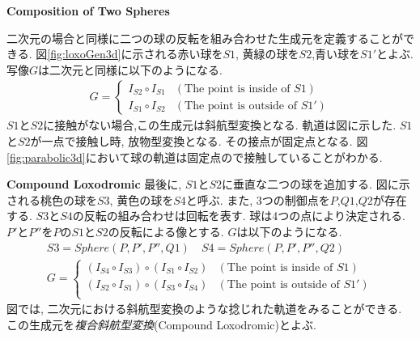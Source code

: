 \noindent\textbf{Composition of Two Spheres}

二次元の場合と同様に二つの球の反転を組み合わせた生成元を定義することができる.
図\ref{fig:loxoGen3d}に示される赤い球を$S1$, 黄緑の球を$S2$,青い球を$S1'$とよぶ.
写像$G$は二次元と同様に以下のようになる.
\begin{align*}
G =
\begin{cases}
 I_{S2} \circ I_{S1} & (\text{The point is inside of } S1) \\
 I_{S1} \circ I_{S2} & (\text{The point is outside of }S1')
\end{cases}
\end{align*}
$S1$と$S2$に接触がない場合,この生成元は斜航型変換となる.
軌道は図に示した.
$S1$と$S2$が一点で接触し時, 放物型変換となる.
その接点が固定点となる.
図\ref{fig:parabolic3d}において球の軌道は固定点ので接触していることがわかる.

\noindent\textbf{Compound Loxodromic}
最後に, $S1$と$S2$に垂直な二つの球を追加する.
図に示される桃色の球を$S3$, 黄色の球を$S4$と呼ぶ.
また, 3つの制御点を$P$,$Q1$,$Q2$が存在する.
$S3$と$S4$の反転の組み合わせは回転を表す.
球は4つの点により決定される.
$P'$と$P''$を$P$の$S1$と$S2$の反転による像とする.
$G$は以下のようになる.
\begin{align*}
S3 = Sphere(P, P', P'', Q1) \quad
S4 = Sphere(P, P', P'', Q2) \\
G =
\begin{cases}
 (I_{S4} \circ I_{S3}) \circ (I_{S1} \circ I_{S2}) & (\text{The point is inside of } S1) \\
 (I_{S2} \circ I_{S1}) \circ (I_{S3} \circ I_{S4}) & (\text{The point is outside of }S1')\\
\end{cases}
\end{align*}
図では, 二次元における斜航型変換のような捻じれた軌道をみることができる.
この生成元を\emph{複合斜航型変換}(Compound Loxodromic)とよぶ.


